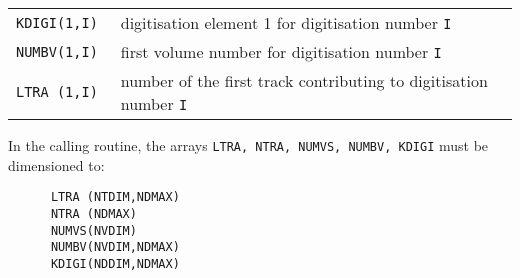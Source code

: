 \begin{tabular}{lp{10cm}}
\tt KDIGI(1,I) & digitisation element 1 for digitisation number {\tt I} \\
\tt NUMBV(1,I) & first volume number for digitisation number {\tt I} \\
\tt LTRA (1,I) & number of the first track contributing to digitisation 
number {\tt I} \\
\end{tabular}

In the calling routine, the arrays {\tt LTRA, NTRA, NUMVS, NUMBV,
KDIGI} must be dimensioned to:
\begin{verbatim}
      LTRA (NTDIM,NDMAX)
      NTRA (NDMAX)
      NUMVS(NVDIM)
      NUMBV(NVDIM,NDMAX)
      KDIGI(NDDIM,NDMAX)
\end{verbatim}
 
